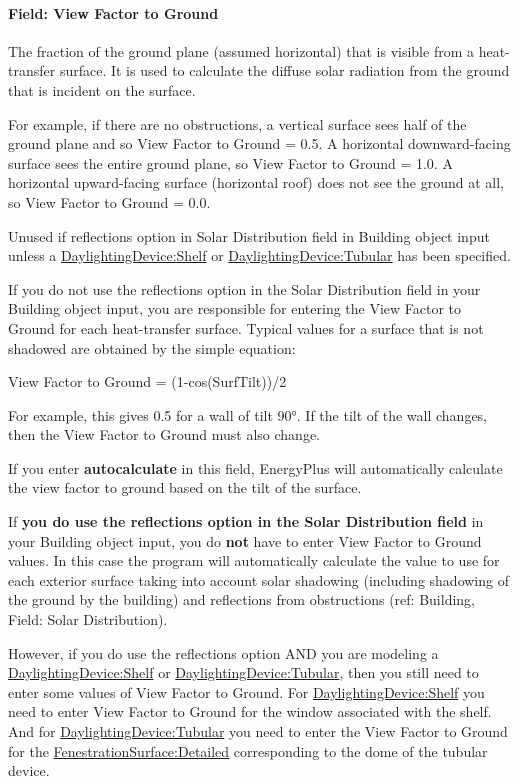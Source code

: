 \paragraph{Field: View Factor to Ground}\label{field-view-factor-to-ground-1}

The fraction of the ground plane (assumed horizontal) that is visible from a heat-transfer surface. It is used to calculate the diffuse solar radiation from the ground that is incident on the surface.

For example, if there are no obstructions, a vertical surface sees half of the ground plane and so View Factor to Ground = 0.5. A horizontal downward-facing surface sees the entire ground plane, so View Factor to Ground = 1.0. A horizontal upward-facing surface (horizontal roof) does not see the ground at all, so View Factor to Ground = 0.0.

Unused if reflections option in Solar Distribution field in Building object input unless a \hyperref[daylightingdeviceshelf]{DaylightingDevice:Shelf} or \hyperref[daylightingdevicetubular]{DaylightingDevice:Tubular} has been specified.

If you do not use the reflections option in the Solar Distribution field in your Building object input, you are responsible for entering the View Factor to Ground for each heat-transfer surface. Typical values for a surface that is not shadowed are obtained by the simple equation:

View Factor to Ground = (1-cos(SurfTilt))/2

For example, this gives 0.5 for a wall of tilt 90°. If the tilt of the wall changes, then the View Factor to Ground must also change.

If you enter \textbf{autocalculate} in this field, EnergyPlus will automatically calculate the view factor to ground based on the tilt of the surface.

If \textbf{you do use the reflections option in the Solar Distribution field} in your Building object input, you do \textbf{not} have to enter View Factor to Ground values. In this case the program will automatically calculate the value to use for each exterior surface taking into account solar shadowing (including shadowing of the ground by the building) and reflections from obstructions (ref: Building, Field: Solar Distribution).

However, if you do use the reflections option AND you are modeling a \hyperref[daylightingdeviceshelf]{DaylightingDevice:Shelf} or \hyperref[daylightingdevicetubular]{DaylightingDevice:Tubular}, then you still need to enter some values of View Factor to Ground. For \hyperref[daylightingdeviceshelf]{DaylightingDevice:Shelf} you need to enter View Factor to Ground for the window associated with the shelf. And for \hyperref[daylightingdevicetubular]{DaylightingDevice:Tubular} you need to enter the View Factor to Ground for the \hyperref[fenestrationsurfacedetailed]{FenestrationSurface:Detailed} corresponding to the dome of the tubular device.

